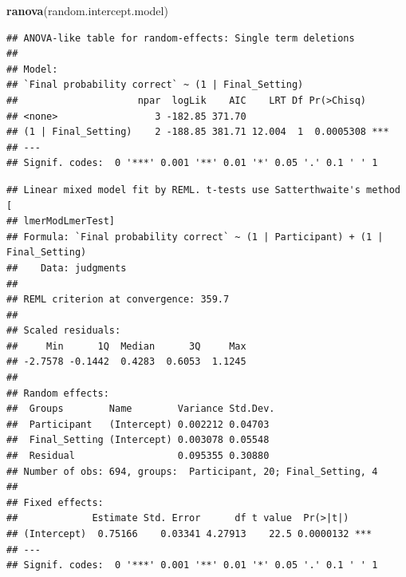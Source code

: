 \documentclass[
]{article}
\newenvironment{Shaded}{\begin{snugshade}}{\end{snugshade}}
\newcommand{\AttributeTok}[1]{\textcolor[rgb]{0.13,0.29,0.53}{#1}}
\newcommand{\ConstantTok}[1]{\textcolor[rgb]{0.56,0.35,0.01}{#1}}
\newcommand{\DecValTok}[1]{\textcolor[rgb]{0.00,0.00,0.81}{#1}}
\newcommand{\FunctionTok}[1]{\textcolor[rgb]{0.13,0.29,0.53}{\textbf{#1}}}
\newcommand{\NormalTok}[1]{#1}
\newcommand{\OtherTok}[1]{\textcolor[rgb]{0.56,0.35,0.01}{#1}}
\newcommand{\SpecialCharTok}[1]{\textcolor[rgb]{0.81,0.36,0.00}{\textbf{#1}}}
\newcommand{\StringTok}[1]{\textcolor[rgb]{0.31,0.60,0.02}{#1}}
\begin{document}
\begin{Shaded}
\begin{Highlighting}[]
\FunctionTok{ranova}\NormalTok{(random.intercept.model)}
\end{Highlighting}
\end{Shaded}

\begin{verbatim}
## ANOVA-like table for random-effects: Single term deletions
## 
## Model:
## `Final probability correct` ~ (1 | Final_Setting)
##                     npar  logLik    AIC    LRT Df Pr(>Chisq)    
## <none>                 3 -182.85 371.70                         
## (1 | Final_Setting)    2 -188.85 381.71 12.004  1  0.0005308 ***
## ---
## Signif. codes:  0 '***' 0.001 '**' 0.01 '*' 0.05 '.' 0.1 ' ' 1
\end{verbatim}

\begin{Shaded}
\end{Shaded}

\begin{verbatim}
## Linear mixed model fit by REML. t-tests use Satterthwaite's method [
## lmerModLmerTest]
## Formula: `Final probability correct` ~ (1 | Participant) + (1 | Final_Setting)
##    Data: judgments
## 
## REML criterion at convergence: 359.7
## 
## Scaled residuals: 
##     Min      1Q  Median      3Q     Max 
## -2.7578 -0.1442  0.4283  0.6053  1.1245 
## 
## Random effects:
##  Groups        Name        Variance Std.Dev.
##  Participant   (Intercept) 0.002212 0.04703 
##  Final_Setting (Intercept) 0.003078 0.05548 
##  Residual                  0.095355 0.30880 
## Number of obs: 694, groups:  Participant, 20; Final_Setting, 4
## 
## Fixed effects:
##             Estimate Std. Error      df t value  Pr(>|t|)    
## (Intercept)  0.75166    0.03341 4.27913    22.5 0.0000132 ***
## ---
## Signif. codes:  0 '***' 0.001 '**' 0.01 '*' 0.05 '.' 0.1 ' ' 1
\end{verbatim}
\end{document}
